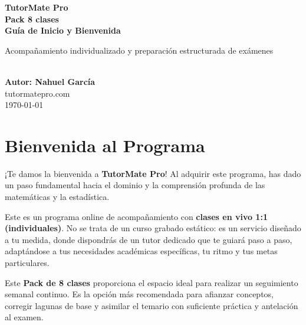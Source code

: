 \documentclass[11pt,a4paper]{article}
\begin{document}
\begin{titlepage}
    \centering
    \vspace*{2cm}
    {\Huge \color{primary} \textbf{TutorMate Pro}} \\[0.5cm]
    {\huge \color{accent} \textbf{Pack 8 clases}} \\[0.8cm]
    {\Large \color{gold} \textbf{Guía de Inicio y Bienvenida}} \\[1.5cm]
    
    \begin{minipage}{0.8\textwidth}
        \centering
        \large \color{primary} Acompañamiento individualizado y preparación estructurada de exámenes
    \end{minipage} \\[2cm]
    
    \vspace*{\fill}
    {\large \color{primary} \textbf{Autor: Nahuel García}} \\
    {\large \color{primary} tutormatepro.com} \\
    {\small \color{accent} \today}
\end{titlepage}

\newpage
\tableofcontents
\newpage

\section{Bienvenida al Programa}
¡Te damos la bienvenida a \textbf{TutorMate Pro}! Al adquirir este programa, has dado un paso fundamental hacia el dominio y la comprensión profunda de las matemáticas y la estadística. 

Este es un programa online de acompañamiento con \textbf{clases en vivo 1:1 (individuales)}. No se trata de un curso grabado estático: es un servicio diseñado a tu medida, donde dispondrás de un tutor dedicado que te guiará paso a paso, adaptándose a tus necesidades académicas específicas, tu ritmo y tus metas particulares.

Este \textbf{Pack de 8 clases} proporciona el espacio ideal para realizar un seguimiento semanal continuo. Es la opción más recomendada para afianzar conceptos, corregir lagunas de base y asimilar el temario con suficiente práctica y antelación al examen.
\end{document}

